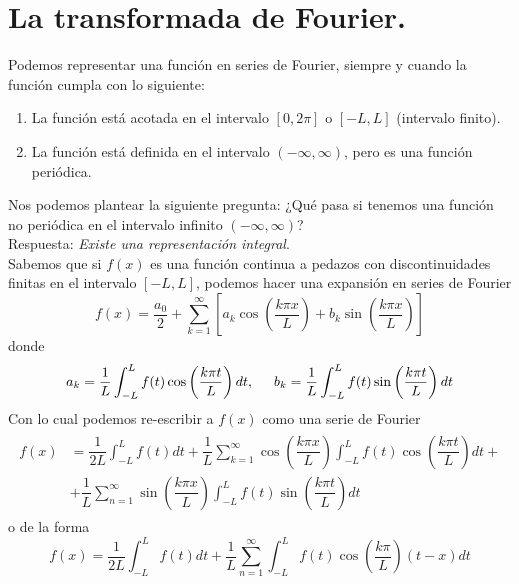 \section{La transformada de Fourier.}
Podemos representar una función en series de Fourier, siempre y cuando la función cumpla con lo siguiente:
\begin{enumerate}
\item La función está acotada en el intervalo $[0, 2\pi]$ o $[-L,L]$ (intervalo finito).
\item La función está definida en el intervalo $(- \infty, \infty)$, pero es una función periódica.
\end{enumerate}
Nos podemos plantear la siguiente pregunta: ¿Qué pasa si tenemos una función no periódica en el intervalo infinito $(-\infty,\infty)$?
\\
Respuesta: \emph{Existe una representación integral}.
\\
Sabemos que si $f(x)$ es una función continua a pedazos con discontinuidades finitas en el intervalo $[-L,L]$, podemos hacer una expansión en series de Fourier
\begin{equation}
f(x) = \dfrac{a_{0}}{2} + \sum_{k=1}^{\infty} \left[ a_{k} \cos \left( \dfrac{k \pi x}{L} \right) + b_{k} \sin \left( \dfrac{k \pi x}{L} \right) \right]
\label{eq:8_11}
\end{equation}
donde
\begin{equation}
a_{k} = \dfrac{1}{L} \int_{-L}^{L} f(t) \cos \left( \dfrac{k \pi t}{L} \right) dt, \hspace{0.5cm} b_{k} = \dfrac{1}{L} \int_{-L}^{L} f(t) \sin \left( \dfrac{k \pi t}{L} \right) dt
\label{eq:8_12}
\end{equation}
Con lo cual podemos re-escribir a $f(x)$ como una serie de Fourier
\begin{align}
\begin{aligned}
f(x) &= \dfrac{1}{2L} \int_{-L}^{L} f(t) dt + \dfrac{1}{L} \sum_{k=1}^{\infty} \cos \left( \dfrac{k \pi x}{L} \right) \int_{-L}^{L} f(t) \cos \left( \dfrac{k \pi t}{L} \right) dt + \\
&+ \dfrac{1}{L} \sum_{n=1}^{\infty}  \sin \left( \dfrac{k \pi x}{L} \right) \int_{-L}^{L} f(t) \sin \left( \dfrac{k \pi t}{L} \right) dt
\label{eq:8_13}
\end{aligned}
\end{align}
o de la forma
\begin{equation}
f(x) = \dfrac{1}{2L} \int_{-L}^{L} f(t) dt + \dfrac{1}{L} \sum_{n=1}^{\infty} \int_{-L}^{L} f(t) \cos \left( \dfrac{k \pi}{L} \right) (t - x) dt
\label{eq:8_15}
\end{equation}
